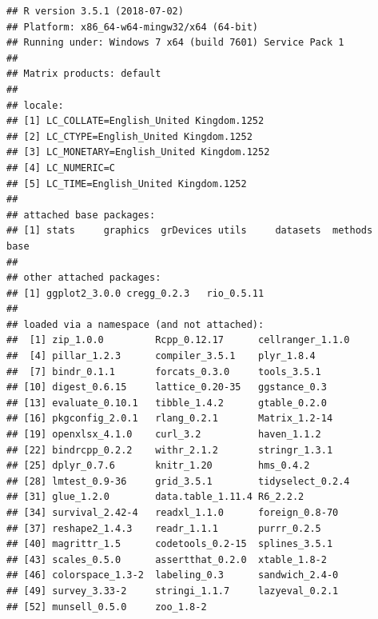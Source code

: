 \documentclass[a4paper,12pt]{article}\usepackage[]{graphicx}\usepackage[]{color}
\makeatletter
\newenvironment{kframe}{%
 \def\at@end@of@kframe{}%
 \ifinner\ifhmode%
  \def\at@end@of@kframe{\end{minipage}}%
  \begin{minipage}{\columnwidth}%
 \fi\fi%
 \def\FrameCommand##1{\hskip\@totalleftmargin \hskip-\fboxsep
 \colorbox{shadecolor}{##1}\hskip-\fboxsep
     \hskip-\linewidth \hskip-\@totalleftmargin \hskip\columnwidth}%
 \MakeFramed {\advance\hsize-\width
   \@totalleftmargin\z@ \linewidth\hsize
   \@setminipage}}%
 {\par\unskip\endMakeFramed%
 \at@end@of@kframe}
\newenvironment{knitrout}{}{} %
\makeatother
\begin{document}
\begin{knitrout}
\color{fgcolor}\begin{kframe}
\begin{verbatim}
## R version 3.5.1 (2018-07-02)
## Platform: x86_64-w64-mingw32/x64 (64-bit)
## Running under: Windows 7 x64 (build 7601) Service Pack 1
## 
## Matrix products: default
## 
## locale:
## [1] LC_COLLATE=English_United Kingdom.1252 
## [2] LC_CTYPE=English_United Kingdom.1252   
## [3] LC_MONETARY=English_United Kingdom.1252
## [4] LC_NUMERIC=C                           
## [5] LC_TIME=English_United Kingdom.1252    
## 
## attached base packages:
## [1] stats     graphics  grDevices utils     datasets  methods   base     
## 
## other attached packages:
## [1] ggplot2_3.0.0 cregg_0.2.3   rio_0.5.11   
## 
## loaded via a namespace (and not attached):
##  [1] zip_1.0.0         Rcpp_0.12.17      cellranger_1.1.0 
##  [4] pillar_1.2.3      compiler_3.5.1    plyr_1.8.4       
##  [7] bindr_0.1.1       forcats_0.3.0     tools_3.5.1      
## [10] digest_0.6.15     lattice_0.20-35   ggstance_0.3     
## [13] evaluate_0.10.1   tibble_1.4.2      gtable_0.2.0     
## [16] pkgconfig_2.0.1   rlang_0.2.1       Matrix_1.2-14    
## [19] openxlsx_4.1.0    curl_3.2          haven_1.1.2      
## [22] bindrcpp_0.2.2    withr_2.1.2       stringr_1.3.1    
## [25] dplyr_0.7.6       knitr_1.20        hms_0.4.2        
## [28] lmtest_0.9-36     grid_3.5.1        tidyselect_0.2.4 
## [31] glue_1.2.0        data.table_1.11.4 R6_2.2.2         
## [34] survival_2.42-4   readxl_1.1.0      foreign_0.8-70   
## [37] reshape2_1.4.3    readr_1.1.1       purrr_0.2.5      
## [40] magrittr_1.5      codetools_0.2-15  splines_3.5.1    
## [43] scales_0.5.0      assertthat_0.2.0  xtable_1.8-2     
## [46] colorspace_1.3-2  labeling_0.3      sandwich_2.4-0   
## [49] survey_3.33-2     stringi_1.1.7     lazyeval_0.2.1   
## [52] munsell_0.5.0     zoo_1.8-2
\end{verbatim}
\end{kframe}
\end{knitrout}
\end{document}
